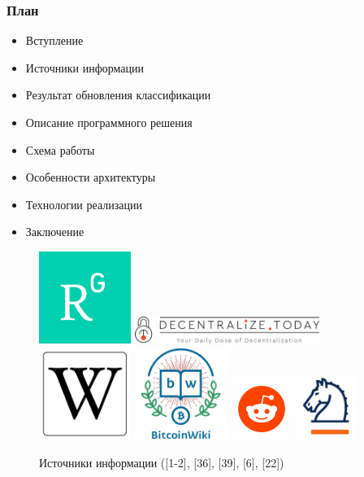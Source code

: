 \documentclass{beamer}
\begin{document}
\begin{frame}
    \frametitle{План}
    \begin{itemize}
        \item Вступление
        \item Источники информации
        \item Результат обновления классификации
        \item Описание программного решения
        \item Схема работы
        \item Особенности архитектуры
        \item Технологии реализации
        \item Заключение
    \end{itemize}
\end{frame}

\begin{frame}
    \begin{figure}
    \includegraphics[width=3cm]{rg_logo}\pause
    \vfill
    \includegraphics[width=6cm]{decentr_logo}\pause
    \includegraphics[width=3cm]{wiki_logo}\pause
    \includegraphics[width=3cm]{btcwiki_logo}\pause
    \hfill
    \includegraphics[width=2cm]{reddit_logo}\pause
    \includegraphics[width=2cm]{springer_logo}
        \caption{Источники информации ([1-2], [36], [39], [6], [22])}
    \end{figure}
\end{frame}
\end{document}
